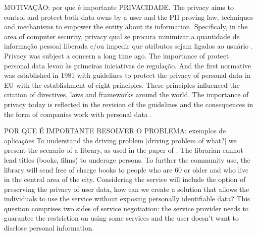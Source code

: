 \documentclass{doublecol-new}
\begin{document}
MOTIVAÇÃO: por que é importante PRIVACIDADE.
The privacy aims to control and protect both data owns by a user and the PII proving law, techniques and mechanisms to empower the entity about its information. Specificaly, in the area of computer security, privacy qual se procura minimizar a quantidade de informação pessoal liberada e/ou impedir que atributos sejam ligados ao usuário \citep{gurses2011engineering,heurix2015taxonomy,landwehr2012privacy}. Privacy was subject a concern a long time ago. The importance of protect personal data levou às primeiras iniciativas de regulação. And the first normative was established in 1981 with guidelines to protect the privacy of personal data in EU \citep{oecd1981guidelines} with the establishment of eight principles. These principles influenced the criation of directives, laws and frameworks around the world. The importance of privacy today is reflected in the revision of the guidelines \citep{oecd2013guidelinesupdated} and the consequences in the form of companies work with personal data \citep{kuschewsky2014new}. 

POR QUE É IMPORTANTE RESOLVER O PROBLEMA: exemplos de aplicações
To understand the driving problem [driving problem of what?] we present the scenario of a library, as used in the paper of \citep{camenisch2014concepts}. The librarian cannot lend titles (books, films) to underage persons. To further the community use, the library will send free of charge books to people who are 60 or older and who live in the central area of the city. Considering the service will include the option of preserving the privacy of user data, how can we create a solution that allows the individuals to use the service without exposing personally identifiable data? This question comprises two sides of service negotiation: the service provider needs to guarantee the restriction on using some services and the user doesn't want to disclose personal information.
\end{document}

